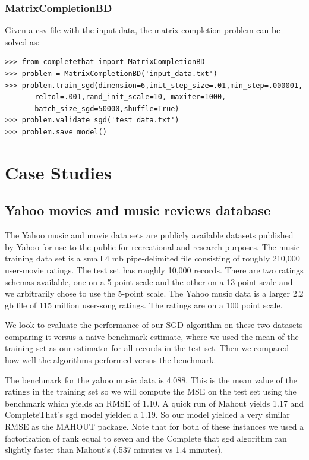 \documentclass[12pt]{article}
\begin{document}
\subsubsection*{MatrixCompletionBD}
Given a csv file with the input data, the matrix completion problem can be solved as:

\begin{verbatim}
>>> from completethat import MatrixCompletionBD
>>> problem = MatrixCompletionBD('input_data.txt')
>>> problem.train_sgd(dimension=6,init_step_size=.01,min_step=.000001, 
       reltol=.001,rand_init_scale=10, maxiter=1000,
       batch_size_sgd=50000,shuffle=True)
>>> problem.validate_sgd('test_data.txt')
>>> problem.save_model()
\end{verbatim}

\section{Case Studies}
\subsection*{Yahoo movies and music reviews database}
The Yahoo music and movie data sets are publicly available datasets published by Yahoo for use to the public for recreational and research purposes. The music training data set is a small 4 mb pipe-delimited file consisting of roughly 210,000 user-movie ratings. The test set has roughly 10,000 records. There are two ratings schemas available, one on a 5-point scale and the other on a 13-point scale and we arbitrarily chose to use the 5-point scale. The Yahoo music data is a larger 2.2 gb file of 115 million user-song ratings. The ratings are on a 100 point scale.
 
We look to evaluate the performance of our SGD algorithm on these two datasets comparing it versus a naive benchmark estimate, where we used the mean of the training set as our estimator for all records in the test set. Then we compared how well the algorithms performed versus the benchmark. 

The benchmark for the yahoo music data is 4.088. This is the mean value of the ratings in the training set so we will compute the MSE on the test set using the benchmark which yields an RMSE of 1.10. A quick run of Mahout yields 1.17 and CompleteThat's sgd model yielded a 1.19. So our model yielded a very similar RMSE as the MAHOUT package. Note that for both of these instances we used a factorization of rank equal to seven and the Complete that sgd algorithm ran slightly faster than Mahout's (.537 minutes vs 1.4 minutes). 
\end{document}
